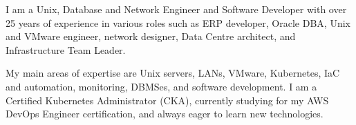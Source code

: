
I am a Unix, Database and Network Engineer and Software Developer with over 25 years of experience in various roles such as ERP developer, Oracle DBA, Unix and VMware engineer, network designer, Data Centre architect, and Infrastructure Team Leader.
\par
My main areas of expertise are Unix servers, LANs, VMware, Kubernetes, IaC and automation, monitoring, DBMSes, and software development. I am a Certified Kubernetes Administrator (CKA), currently studying for my AWS DevOps Engineer certification, and always eager to learn new technologies.
